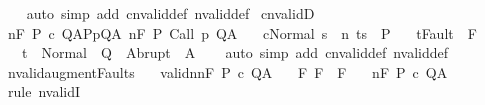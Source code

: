 \begin{isabellebody}
%
\isadelimproof
\ \ %
\endisadelimproof
%
\isatagproof
{}\isamarkupfalse%
\ {\isacharparenleft}auto\ simp\ add{\isacharcolon}\ cnvalid{\isacharunderscore}def\ nvalid{\isacharunderscore}def{\isacharparenright}%
\endisatagproof
{\isafoldproof}%
%
\isadelimproof
\isanewline
%
\endisadelimproof
\isanewline
\isanewline
{}\isamarkupfalse%
\ cnvalidD{\isacharcolon}\ \isanewline
\ {\isachardoublequoteopen}{\isasymlbrakk}{\isasymGamma}{\isacharcomma}{\isasymTheta}{\isasymTurnstile}n{\isacharcolon}\isactrlbsub {\isacharslash}F\isactrlesub \ P\ c\ Q{\isacharcomma}A{\isacharsemicolon}{\isasymforall}{\isacharparenleft}P{\isacharcomma}p{\isacharcomma}Q{\isacharcomma}A{\isacharparenright}{\isasymin}{\isasymTheta}{\isachardot}\ {\isasymGamma}{\isasymTurnstile}n{\isacharcolon}\isactrlbsub {\isacharslash}F\isactrlesub \ P\ {\isacharparenleft}Call\ p{\isacharparenright}\ Q{\isacharcomma}A{\isacharsemicolon}\isanewline
\ \ \ {\isasymGamma}{\isasymturnstile}{\isasymlangle}c{\isacharcomma}Normal\ s\ {\isasymrangle}\ {\isacharequal}n{\isasymRightarrow}\ t{\isacharsemicolon}s\ {\isasymin}\ P{\isacharsemicolon}\isanewline
\ \ \ t{\isasymnotin}Fault\ {\isacharbackquote}\ F{\isasymrbrakk}\ \isanewline
\ \ {\isasymLongrightarrow}\ t\ {\isasymin}\ Normal\ {\isacharbackquote}\ Q\ {\isasymunion}\ Abrupt\ {\isacharbackquote}\ A{\isachardoublequoteclose}\isanewline
%
\isadelimproof
\ \ %
\endisadelimproof
%
\isatagproof
{}\isamarkupfalse%
\ {\isacharparenleft}auto\ simp\ add{\isacharcolon}\ cnvalid{\isacharunderscore}def\ nvalid{\isacharunderscore}def{\isacharparenright}%
\endisatagproof
{\isafoldproof}%
%
\isadelimproof
\isanewline
%
\endisadelimproof
\isanewline
{}\isamarkupfalse%
\ nvalid{\isacharunderscore}augment{\isacharunderscore}Faults{\isacharcolon}\isanewline
\ \ \ validn{\isacharcolon}{\isachardoublequoteopen}{\isasymGamma}{\isasymTurnstile}n{\isacharcolon}\isactrlbsub {\isacharslash}F\isactrlesub \ P\ c\ Q{\isacharcomma}A{\isachardoublequoteclose}\isanewline
\ \ \ F{\isacharprime}{\isacharcolon}\ {\isachardoublequoteopen}F\ {\isasymsubseteq}\ F{\isacharprime}{\isachardoublequoteclose}\isanewline
\ \ \ {\isachardoublequoteopen}{\isasymGamma}{\isasymTurnstile}n{\isacharcolon}\isactrlbsub {\isacharslash}F{\isacharprime}\isactrlesub \ P\ c\ Q{\isacharcomma}A{\isachardoublequoteclose}\isanewline
%
\isadelimproof
%
\endisadelimproof
%
\isatagproof
{}\isamarkupfalse%
\ {\isacharparenleft}rule\ nvalidI{\isacharparenright}\isanewline
\ \ \isamarkupfalse%

\end{isabellebody}
